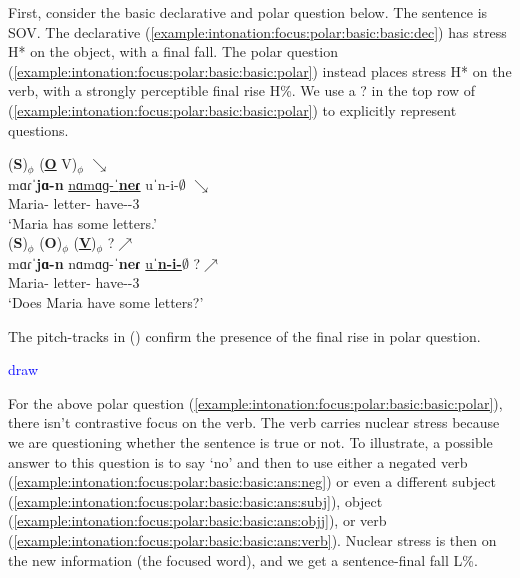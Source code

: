 First, consider the basic declarative and polar question below. The sentence is SOV. The declarative (\ref{example:intonation:focus:polar:basic:basic:dec}) has stress H* on the object, with a final fall. The polar question (\ref{example:intonation:focus:polar:basic:basic:polar}) instead places stress H* on the verb, with a strongly perceptible final rise H\%.  We use a ? in the top row of  (\ref{example:intonation:focus:polar:basic:basic:polar}) to explicitly represent questions. 


\begin{exe}
	\ex \begin{xlist}
		\ex \glll (\textbf{S})$_\phi$ (\textbf{\underline{O}} V)$_\phi$ $\searrow$ \\
		mɑɾˈ\textbf{jɑ-n} \underline{nɑmɑɡ-ˈ\textbf{neɾ}} uˈn-i-$\emptyset$ $\searrow$ \\
		Maria-{} letter-{\pl} have-{\thgloss}-3{\sg} \\ 
		\trans `Maria has some letters.'
		\label{example:intonation:focus:polar:basic:basic:dec}
		\\ 
		\ex \glll (\textbf{S})$_\phi$ (\textbf{{O}})$_\phi$ (\textbf{\underline{V}})$_\phi$ ?$\nearrow$ \\
		mɑɾˈ\textbf{jɑ-n} {nɑmɑɡ-ˈ\textbf{neɾ}} \underline{uˈ\textbf{n-i-$\emptyset$}} ?$\nearrow$ \\
		Maria-{} letter-{\pl} have-{\thgloss}-3{\sg} \\ 
		\trans `Does Maria have some letters?'
		\label{example:intonation:focus:polar:basic:basic:polar}
		\\ 
	\end{xlist}
\end{exe}

The pitch-tracks in () confirm the presence of the final rise in polar question. 

\textcolor{blue}{draw}


For the above polar question  (\ref{example:intonation:focus:polar:basic:basic:polar}), there isn't contrastive focus on the verb. The verb carries nuclear stress because we are questioning whether the sentence is true or not. To illustrate, a possible answer to this question is to say `no' and then to use either a negated verb (\ref{example:intonation:focus:polar:basic:basic:ans:neg}) or even a different subject (\ref{example:intonation:focus:polar:basic:basic:ans:subj}), object (\ref{example:intonation:focus:polar:basic:basic:ans:objj}), or verb (\ref{example:intonation:focus:polar:basic:basic:ans:verb}).    Nuclear stress is then on the new information (the focused word), and we get a sentence-final fall L\%. 

